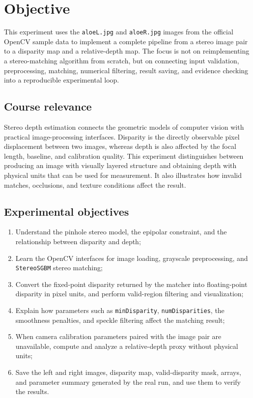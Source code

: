 \section{Objective}

This experiment uses the \texttt{aloeL.jpg} and \texttt{aloeR.jpg} images from the official OpenCV sample data to implement a complete pipeline from a stereo image pair to a disparity map and a relative-depth map. The focus is not on reimplementing a stereo-matching algorithm from scratch, but on connecting input validation, preprocessing, matching, numerical filtering, result saving, and evidence checking into a reproducible experimental loop.

\subsection{Course relevance}

Stereo depth estimation connects the geometric models of computer vision with practical image-processing interfaces. Disparity is the directly observable pixel displacement between two images, whereas depth is also affected by the focal length, baseline, and calibration quality. This experiment distinguishes between producing an image with visually layered structure and obtaining depth with physical units that can be used for measurement. It also illustrates how invalid matches, occlusions, and texture conditions affect the result.

\subsection{Experimental objectives}

\begin{enumerate}
  \item Understand the pinhole stereo model, the epipolar constraint, and the relationship between disparity and depth;
  \item Learn the OpenCV interfaces for image loading, grayscale preprocessing, and \texttt{StereoSGBM} stereo matching;
  \item Convert the fixed-point disparity returned by the matcher into floating-point disparity in pixel units, and perform valid-region filtering and visualization;
  \item Explain how parameters such as \texttt{minDisparity}, \texttt{numDisparities}, the smoothness penalties, and speckle filtering affect the matching result;
  \item When camera calibration parameters paired with the image pair are unavailable, compute and analyze a relative-depth proxy without physical units;
  \item Save the left and right images, disparity map, valid-disparity mask, arrays, and parameter summary generated by the real run, and use them to verify the results.
\end{enumerate}

